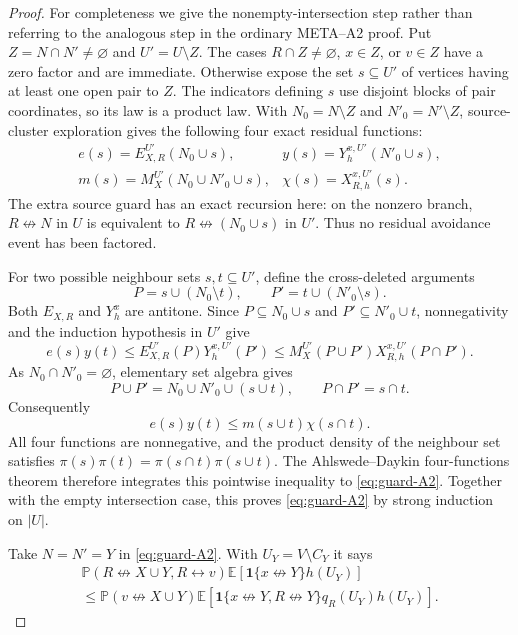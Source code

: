 \documentclass[11pt]{article}
\theoremstyle{definition}
\theoremstyle{remark}
\newcommand{\PP}{\mathbb P}
\newcommand{\EE}{\mathbb E}
\newcommand{\one}{\mathbf 1}
\newcommand{\con}{\leftrightarrow}
\newcommand{\ncon}{\not\leftrightarrow}
\begin{document}
\begin{proof}
For completeness we give the nonempty-intersection step rather than
referring to the analogous step in the ordinary META--A2 proof.  Put
$Z=N\cap N'\ne\varnothing$ and $U'=U\setminus Z$.  The cases
$R\cap Z\ne\varnothing$, $x\in Z$, or $v\in Z$ have a zero factor and
are immediate.  Otherwise expose the set $s\subseteq U'$ of vertices
having at least one open pair to $Z$.  The indicators defining $s$ use
disjoint blocks of pair coordinates, so its law is a product law.  With
$N_0=N\setminus Z$ and $N'_0=N'\setminus Z$, source-cluster exploration
gives the following four exact residual functions:
\[
 \begin{array}{ll}
 e(s)=E_{X,R}^{U'}(N_0\cup s),
 &y(s)=Y_{h}^{x,U'}(N'_0\cup s),\\[2mm]
 m(s)=M_X^{U'}(N_0\cup N'_0\cup s),
 &\chi(s)=X_{R,h}^{x,U'}(s).
 \end{array}
\]
The extra source guard has an exact recursion here: on the nonzero
branch, $R\ncon N$ in $U$ is equivalent to
$R\ncon(N_0\cup s)$ in $U'$.  Thus no residual avoidance event has been
factored.

For two possible neighbour sets $s,t\subseteq U'$, define the
cross-deleted arguments
\[
 P=s\cup(N_0\setminus t),\qquad
 P'=t\cup(N'_0\setminus s).
\]
Both $E_{X,R}$ and $Y_h^x$ are antitone.  Since
$P\subseteq N_0\cup s$ and $P'\subseteq N'_0\cup t$, nonnegativity and
the induction hypothesis in $U'$ give
\[
 e(s)y(t)
 \leq E_{X,R}^{U'}(P)Y_h^{x,U'}(P')
 \leq M_X^{U'}(P\cup P')X_{R,h}^{x,U'}(P\cap P').
\]
As $N_0\cap N'_0=\varnothing$, elementary set algebra gives
\[
 P\cup P'=N_0\cup N'_0\cup(s\cup t),
 \qquad P\cap P'=s\cap t.
\]
Consequently
\[
 e(s)y(t)\leq m(s\cup t)\chi(s\cap t).
\]
All four functions are nonnegative, and the product density of the
neighbour set satisfies
$\pi(s)\pi(t)=\pi(s\cap t)\pi(s\cup t)$.  The
Ahlswede--Daykin four-functions theorem therefore integrates this
pointwise inequality to \eqref{eq:guard-A2}.  Together with the empty
intersection case, this proves \eqref{eq:guard-A2} by strong induction
on $|U|$.

Take $N=N'=Y$ in \eqref{eq:guard-A2}.  With
$U_Y=V\setminus C_Y$ it says
\begin{multline}\label{eq:guard-Htw}
 \PP(R\ncon X\cup Y,R\con v)
 \EE[\one\{x\ncon Y\}h(U_Y)]\\
 \leq \PP(v\ncon X\cup Y)
 \EE[\one\{x\ncon Y,R\ncon Y\}q_R(U_Y)h(U_Y)].
\end{multline}


\end{proof}
\end{document}

